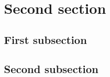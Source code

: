 \documentclass{article}
\begin{document}

\section{Second section}

\subsection{First subsection}

\lipsum[1]

\subsection{Second subsection}

\lipsum[2]
\end{document}
